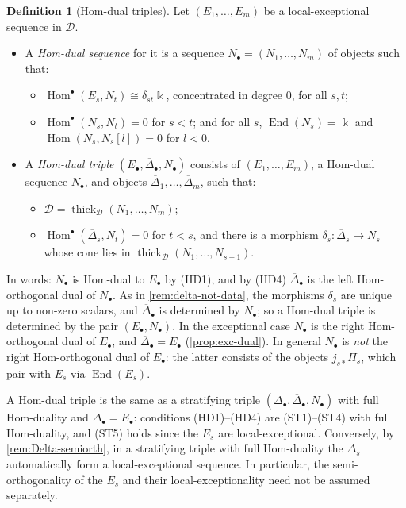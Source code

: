 \documentclass[11pt,reqno]{amsart}
\theoremstyle{plain}
\theoremstyle{definition}
\newtheorem{definition}[theorem]{Definition}
\theoremstyle{remark}
\newcommand{\kk}{\Bbbk}
\DeclareMathOperator{\Hom}{Hom}
\DeclareMathOperator{\End}{End}
\newcommand{\thick}[2][\cD]{\operatorname{thick}_{#1}(#2)}
\newcommand{\Deltabar}{\overline{\Delta}}
\newcommand{\cD}{\mathcal{D}}
\begin{document}
\begin{definition}[Hom-dual triples]\label{def:hom-dual}
Let $(E_1,\dots,E_m)$ be a local-exceptional sequence in $\cD$.
\begin{itemize}
\item A \emph{Hom-dual sequence} for it is a sequence $N_\bullet=(N_1,\dots,N_m)$ of objects such that:
\begin{itemize}
\item[\textup{(HD1)}] $\Hom^\bullet(E_s,N_t)\cong\delta_{st}\kk$, concentrated in degree $0$, for all $s,t$;
\item[\textup{(HD2)}] $\Hom^\bullet(N_s,N_t)=0$ for $s<t$; and for all $s$, $\End(N_s)=\kk$ and $\Hom(N_s,N_s[l])=0$ for $l<0$.
\end{itemize}
\item A \emph{Hom-dual triple} $(E_\bullet,\Deltabar_\bullet,N_\bullet)$ consists of $(E_1,\dots,E_m)$, a Hom-dual sequence $N_\bullet$, and objects $\Deltabar_1,\dots,\Deltabar_m$, such that:
\begin{itemize}
\item[\textup{(HD3)}] $\cD=\thick{N_1,\dots,N_m}$;
\item[\textup{(HD4)}] $\Hom^\bullet(\Deltabar_s,N_t)=0$ for $t<s$, and there is a morphism $\delta_s\colon\Deltabar_s\to N_s$ whose cone lies in $\thick{N_1,\dots,N_{s-1}}$.
\end{itemize}
\end{itemize}
\end{definition}

In words: $N_\bullet$ is Hom-dual to $E_\bullet$ by (HD1), and by (HD4) $\Deltabar_\bullet$ is the left Hom-orthogonal dual of $N_\bullet$. As in \cref{rem:delta-not-data}, the morphisms $\delta_s$ are unique up to non-zero scalars, and $\Deltabar_\bullet$ is determined by $N_\bullet$; so a Hom-dual triple is determined by the pair $(E_\bullet,N_\bullet)$. In the exceptional case $N_\bullet$ is the right Hom-orthogonal dual of $E_\bullet$, and $\Deltabar_\bullet=E_\bullet$ (\cref{prop:exc-dual}). In general $N_\bullet$ is \emph{not} the right Hom-orthogonal dual of $E_\bullet$: the latter consists of the objects $j_{s*}\Pi_s$, which pair with $E_s$ via $\End(E_s)$.

A Hom-dual triple is the same as a stratifying triple $(\Delta_\bullet,\Deltabar_\bullet,N_\bullet)$ with full Hom-duality and $\Delta_\bullet=E_\bullet$: conditions (HD1)--(HD4) are (ST1)--(ST4) with full Hom-duality, and (ST5) holds since the $E_s$ are local-exceptional. Conversely, by \cref{rem:Delta-semiorth}, in a stratifying triple with full Hom-duality the $\Delta_s$ automatically form a local-exceptional sequence. In particular, the semi-orthogonality of the $E_s$ and their local-exceptionality need not be assumed separately.
\end{document}
